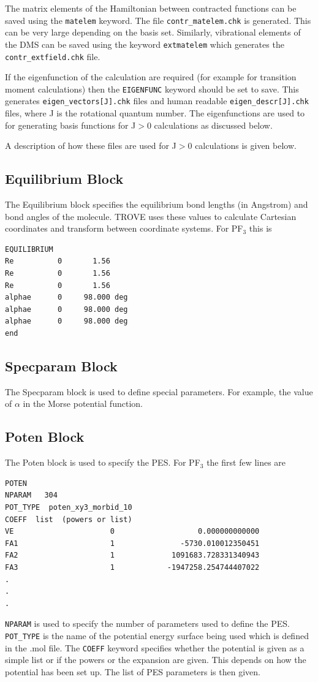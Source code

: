 The matrix elements of the Hamiltonian between contracted functions can be saved using the \verb|matelem| keyword. The file 
\verb|contr_matelem.chk| is generated. This can be very large depending on the basis set.
Similarly, vibrational elements of the DMS can be saved using the keyword \verb|extmatelem| 
which generates the \verb|contr_extfield.chk| file. 

If the eigenfunction of the calculation are required (for example for transition moment calculations) 
then the \verb|EIGENFUNC| keyword should be set to save. 
This generates \verb|eigen_vectors[J].chk| files and human readable \verb|eigen_descr[J].chk| files, where J is the rotational
quantum number. The eigenfunctions are used to for generating basis functions for J$>$0 calculations as discussed below. 

A description of how these files are used for J$>$0 calculations is given below.


\subsection{Equilibrium Block}
The Equilibrium block specifies the equilibrium bond lengths (in Angstrom) and bond angles of the molecule. 
TROVE uses these values
to calculate Cartesian coordinates and transform between coordinate systems. For PF$_3$ this is
\begin{verbatim}
EQUILIBRIUM
Re          0       1.56
Re          0       1.56
Re          0       1.56
alphae      0     98.000 deg
alphae      0     98.000 deg
alphae      0     98.000 deg
end
\end{verbatim}



\subsection{Specparam Block}
The Specparam block is used to define special parameters. For example, the value of $\alpha$ in the Morse potential 
function.


\subsection{Poten Block}
The Poten block is used to specify the PES. For PF$_3$ the first few lines are 
\begin{verbatim}
POTEN
NPARAM   304
POT_TYPE  poten_xy3_morbid_10
COEFF  list  (powers or list)
VE                      0                   0.000000000000
FA1                     1               -5730.010012350451
FA2                     1             1091683.728331340943
FA3                     1            -1947258.254744407022
.
.
.
\end{verbatim}
\verb|NPARAM| is used to specify the number of parameters used to define the PES. 
\verb|POT_TYPE| is the name of the potential energy surface being used which is defined in
the .mol file. The \verb|COEFF| keyword specifies whether the potential is given as a simple list or if the powers or the 
expansion are given. This depends on how the potential has been set up. The list of PES parameters is then given. 

